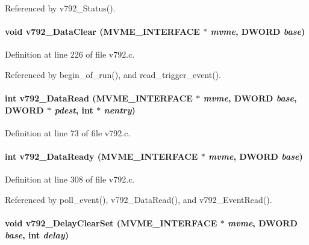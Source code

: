 Referenced by v792\_\-Status().
\paragraph[{v792\_\-DataClear}]{\setlength{\rightskip}{0pt plus 5cm}void v792\_\-DataClear ({\bf MVME\_\-INTERFACE} $\ast$ {\em mvme}, \/  {\bf DWORD} {\em base})}\hfill\label{v792_8h_a526dbfe955e68a6e982bb5a3345b74e3}


Definition at line 226 of file v792.c.

Referenced by begin\_\-of\_\-run(), and read\_\-trigger\_\-event().
\paragraph[{v792\_\-DataRead}]{\setlength{\rightskip}{0pt plus 5cm}int v792\_\-DataRead ({\bf MVME\_\-INTERFACE} $\ast$ {\em mvme}, \/  {\bf DWORD} {\em base}, \/  {\bf DWORD} $\ast$ {\em pdest}, \/  int $\ast$ {\em nentry})}\hfill\label{v792_8h_a885c3ecd779966cb3c94376eaafc1e63}


Definition at line 73 of file v792.c.
\paragraph[{v792\_\-DataReady}]{\setlength{\rightskip}{0pt plus 5cm}int v792\_\-DataReady ({\bf MVME\_\-INTERFACE} $\ast$ {\em mvme}, \/  {\bf DWORD} {\em base})}\hfill\label{v792_8h_a9103a1615a623d5e79c0353045abaafa}


Definition at line 308 of file v792.c.

Referenced by poll\_\-event(), v792\_\-DataRead(), and v792\_\-EventRead().
\paragraph[{v792\_\-DelayClearSet}]{\setlength{\rightskip}{0pt plus 5cm}void v792\_\-DelayClearSet ({\bf MVME\_\-INTERFACE} $\ast$ {\em mvme}, \/  {\bf DWORD} {\em base}, \/  int {\em delay})}\hfill\label{v792_8h_a507c3df154ff7b33ff13e750dca6af07}
